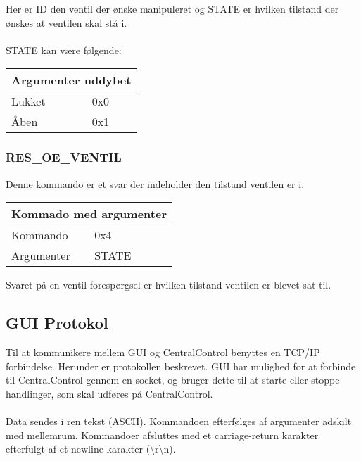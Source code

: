 Her er ID den ventil der ønske manipuleret og STATE er hvilken tilstand der ønskes at ventilen skal stå i.\\\\
STATE kan være følgende:
\begin{table}[H]
\setlength{\parindent}{12pt}
\begin{tabular}{|l|l|}
\hline
\multicolumn{2}{|c|}{Argumenter uddybet}\\\hline
Lukket & 0x0 \\
Åben & 0x1 \\\hline
\end{tabular}
\end{table}

\subsubsection{RES\_OE\_VENTIL}
Denne kommando er et svar der indeholder den tilstand ventilen er i.

\begin{table}[H]
\setlength{\parindent}{12pt}
\begin{tabular}{|l|lcc|}
\hline
\multicolumn{4}{|c|}{Kommado med argumenter}\\\hline
Kommando & 0x4 & & \\
Argumenter & STATE & & \\\hline
\end{tabular}
\end{table}

Svaret på en ventil forespørgsel er hvilken tilstand ventilen er blevet sat til.


\subsection{GUI Protokol}

Til at kommunikere mellem GUI og CentralControl benyttes en TCP/IP forbindelse. Herunder er protokollen beskrevet. GUI har mulighed for at forbinde til CentralControl gennem en socket, og bruger dette til at starte eller stoppe handlinger, som skal udføres på CentralControl.\\\\

Data sendes i ren tekst (ASCII). Kommandoen efterfølges af argumenter adskilt med mellemrum. Kommandoer afsluttes med et carriage-return karakter efterfulgt af et newline karakter (\textbackslash r\textbackslash n).\\\\

